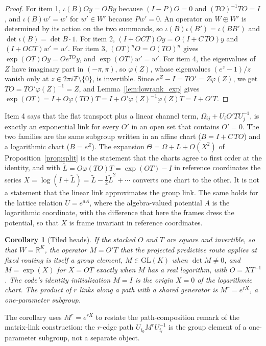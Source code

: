 \documentclass[11pt]{article}
\newtheorem{corollary}[proposition]{Corollary}
\theoremstyle{definition}
\theoremstyle{remark}
\newcommand{\GL}{\mathrm{GL}}
\begin{document}
\begin{proof}
For item 1, $\iota(B)Oy=OBy$ because $(I-P)O=0$ and $(TO)^{-1}TO=I$, and $\iota(B)w'=w'$ for $w'\in W'$ because $Pw'=0$. An operator on $W\oplus W'$ is determined by its action on the two summands, so $\iota(B)\iota(B')=\iota(BB')$ and $\det\iota(B)=\det B\cdot1$. For item 2, $(I+OCT)Oy=O(I+C\,TO)y$ and $(I+OCT)w'=w'$. For item 3, $(OT)^nO=O(TO)^n$ gives $\exp(OT)Oy=Oe^{TO}y$, and $\exp(OT)w'=w'$. For item 4, the eigenvalues of $Z$ have imaginary part in $(-\pi,\pi)$, so $\varphi(Z)$, whose eigenvalues $(e^z-1)/z$ vanish only at $z\in2\pi i\mathbb Z\setminus\{0\}$, is invertible. Since $e^Z-I=TO'=Z\varphi(Z)$, we get $TO=TO'\varphi(Z)^{-1}=Z$, and Lemma~\ref{lem:lowrank_exp} gives $\exp(OT)=I+O\varphi(TO)T=I+O'\varphi(Z)^{-1}\varphi(Z)T=I+O'T$.
\end{proof}

Item 4 says that the flat transport plus a linear channel term, $\Omega_{ij}+U_iO'TU_j^{-1}$, is exactly an exponential link for every $O'$ in an open set that contains $O'=0$. The two families are the same subgroup written in an affine chart ($B=I+C\,TO$) and a logarithmic chart ($B=e^{Z}$). The expansion $\Theta=\Omega+L+O(X^2)$ of Proposition~\ref{prop:split} is the statement that the charts agree to first order at the identity, and with $\widetilde L=O\varphi(TO)T=\exp(OT)-I$ in reference coordinates the series $X=\log(I+\widetilde L)=\widetilde L-\tfrac12\widetilde L^2+\cdots$ converts one chart to the other. It is not a statement that the linear link approximates the group link. The same holds for the lattice relation $U=e^{aA}$, where the algebra-valued potential $A$ is the logarithmic coordinate, with the difference that here the frames dress the potential, so that $X$ is frame invariant in reference coordinates.

\begin{corollary}[Tiled heads]
\label{cor:tiled_chart}
If the stacked $O$ and $T$ are square and invertible, so that $W=\mathbb R^K$, the operator $M=O'T$ that the projected predictive route applies at fixed routing is itself a group element, $M\in\GL(K)$ when $\det M\ne0$, and $M=\exp(X)$ for $X=OT$ exactly when $M$ has a real logarithm, with $O=XT^{-1}$. The code's identity initialization $M=I$ is the origin $X=0$ of the logarithmic chart. The product of $r$ links along a path with a shared generator is $M^r=e^{rX}$, a one-parameter subgroup.
\end{corollary}

The corollary uses $M^r=e^{rX}$ to restate the path-composition remark of the matrix-link construction: the $r$-edge path $U_{i_0}M^rU_{i_r}^{-1}$ is the group element of a one-parameter subgroup, not a separate object.
\end{document}
